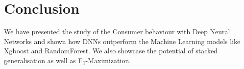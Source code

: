 \section{Conclusion}
We have presented the study of the Consumer behaviour with Deep Neural Networks and shown how
DNNs outperform the Machine Learning models like Xgboost and RandomForest. We also showcase the 
potential of stacked generalisation as well as F\textsubscript{1}-Maximization.